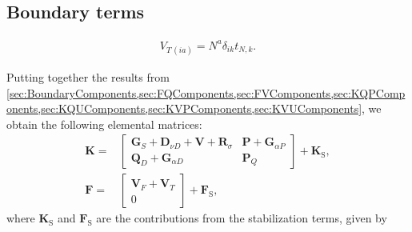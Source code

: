 \subsection{Boundary terms} \label{sec:BoundaryComponents}
\begin{align} \label{eq:VTerm}
  V_{T\, (ia)} =  N^a \delta_{ik} t_{N,k}.
\end{align}

Putting together the results from \cref{sec:BoundaryComponents,sec:FQComponents,sec:FVComponents,sec:KQPComponents,sec:KQUComponents,sec:KVPComponents,sec:KVUComponents}, we obtain the following elemental matrices:
\begin{align}
  \mathbf{K} = &
  \begin{bmatrix}
    \mathbf{G}_S + \mathbf{D}_{\nu D} + \mathbf{V} + \mathbf{R}_\sigma & \mathbf{P} + \mathbf{G}_{\alpha P} \\
    \mathbf{Q}_D + \mathbf{G}_{\alpha D}                              & \mathbf{P}_Q
  \end{bmatrix} + \mathbf{K}_{\mathrm{S}}, \\
  \mathbf{F} = &
  \begin{bmatrix}
    \boldsymbol{V}_F + \boldsymbol{V}_T \\
    0
  \end{bmatrix} + \mathbf{F}_{\mathrm{S}},
\end{align}
where $\mathbf{K}_{\mathrm{S}}$ and $\mathbf{F}_{\mathrm{S}}$ are the contributions from the stabilization terms, given by
\begingroup\footnotesize\setlength{\arraycolsep}{4pt}
